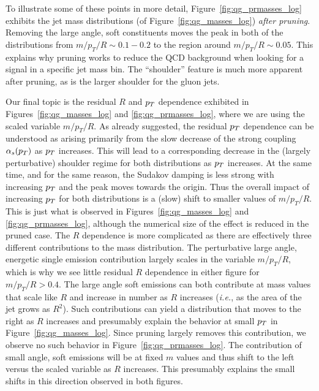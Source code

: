 To illustrate some of these points in more detail, Figure~\ref{fig:qg_prmasses_log} exhibits the jet mass distributions (of  Figure~\ref{fig:qg_masses_log}) 
\textit{after pruning}.  Removing the large angle,  soft constituents
moves the peak in both of the distributions from  $m/p_T/R \sim 0.1 - 0.2$ to the region around $m/p_T/R \sim 0.05$.  This explains why pruning works to reduce the
QCD background when looking for a signal in a specific jet mass bin.  The ``shoulder'' feature is much more apparent after pruning, as is the larger shoulder for
the gluon jets.  

Our final topic is the residual $R$ and $p_T$ dependence exhibited in Figures~\ref{fig:qg_masses_log} and \ref{fig:qg_prmasses_log}, where we are
using the scaled variable $m/p_T/R$.  As already suggested, the residual $p_T$ dependence can be understood as arising primarily from the slow decrease of the strong
coupling $\alpha_s(p_T)$ as $p_T$ increases.  This will lead to a corresponding decrease in the (largely perturbative) shoulder regime for both distributions
as $p_T$ increases.  At the same time, and for the same reason, the Sudakov damping is less strong with increasing $p_T$ and the peak moves towards the origin.
Thus the overall impact of increasing $p_T$ for both distributions is a (slow) shift to smaller values of $m/p_T/R$.  This is just what is observed in 
Figures~\ref{fig:qg_masses_log} and \ref{fig:qg_prmasses_log}, although the numerical size of the effect is reduced in the pruned case.
The $R$ dependence is more complicated as there are effectively three different contributions to the mass distribution.  
The perturbative large angle, energetic single emission contribution
largely scales in the variable $m/p_T/R$, which is why we see little residual $R$ dependence in either figure for $m/p_T/R > 0.4$.  
The large angle soft emissions can both contribute
at mass values that scale like $R$ and increase in number as $R$ increases (\textit{i.e.}, as the area of the jet grows as $R^2$).  Such contributions can yield
a distribution that moves to the right as $R$ increases and presumably explain the behavior at small $p_T$ in Figure~\ref{fig:qg_masses_log}.  Since pruning
largely removes this contribution, we observe no such behavior in Figure~\ref{fig:qg_prmasses_log}.  The contribution of small angle, soft emissions will be at
fixed $m$ values and thus shift to the left versus the scaled variable as $R$ increases.  
This presumably explains the small shifts in this direction observed in both figures.

